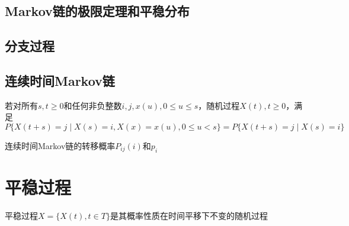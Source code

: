 \documentclass[]{report}
\begin{document}
	\section{Markov链的极限定理和平稳分布}
	\section{分支过程}
	\section{连续时间Markov链}
		\begin{definition}
			若对所有$s,t\ge0$和任何非负整数$i,j,x(u),0\le u\le s$，随机过程$X(t),t\ge0$，满足
			\[P\{X(t+s)=j\mid X(s)=i,X(x)=x(u),0\le u<s\}=P\{X(t+s)=j\mid X(s)=i\}\]
		\end{definition}\par
		连续时间Markov链的转移概率$P_{ij}(i)$和$p_i$


	\chapter{平稳过程}
	平稳过程$X=\{X(t),t\in T\}$是其概率性质在时间平移下不变的随机过程
\end{document}
